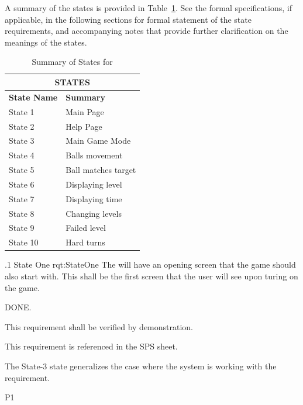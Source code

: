 A summary of the states is provided in Table~\ref{tab:States}.
See the formal specifications, if applicable, in the following sections for formal statement of the state requirements, and accompanying notes that provide further clarification on the meanings of the states.


\begin{table}[h]
	\begin{center}
		\begin{tabular}{|p{1.0in}|p{5.0in}|}
			\hline
			\hline
			\multicolumn{2}{|c|}{{\bf STATES}} \\
			\hline
				{\bf State Name} & {\bf Summary} \\
			\hline
			\hline
State 1  &  Main Page  \\ \hline
State 2  &  Help Page  \\ \hline
State 3  &  Main Game Mode   \\ \hline
State 4  &  Balls movement  \\ \hline
State 5  &  Ball matches target  \\ \hline
State 6  &  Displaying level  \\ \hline
State 7  &  Displaying time  \\ \hline
State 8  &  Changing levels  \\ \hline
State 9  &  Failed level   \\ \hline
State 10 &  Hard turns \\ \hline
			\hline
			\hline
		\end{tabular}
		\caption{Summary of States for \ThisSystem}
		\label{tab:States}
	\end{center}
\end{table}


\ONERQMTVKPP
{\RqtNumberBase.1}
{State One}
{rqt:StateOne}
{The \ThisSys will have an opening screen that the game should also start with. This shall be the first screen that the user will see upon turing on the game.}
{
	\item [Phase 1] DONE.
}
{This requirement shall be verified by demonstration.}
{
	\item [SPS] This requirement is referenced in the SPS sheet.
}
{
	\item The State-3 state generalizes the case where the system is working with the requirement.
}
{P1}


